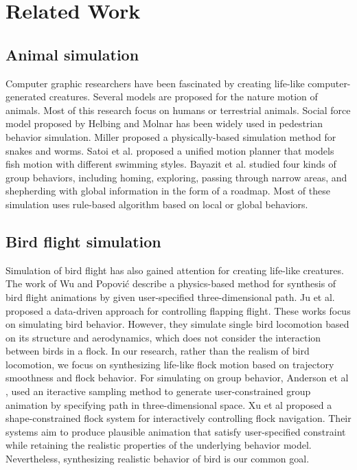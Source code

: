 \chapter{Related Work}

\section{Animal simulation}

Computer graphic researchers have been fascinated by creating life-like computer-generated creatures. Several models are proposed for the nature motion of animals. Most of this research focus on humans or terrestrial animals. Social force model proposed by Helbing and Molnar \cite{Social} has been widely used in pedestrian behavior simulation. Miller \cite{Snake} proposed a physically-based simulation method for snakes and worms. Satoi et al. proposed a unified motion planner \cite{Fish} that models fish motion with different swimming styles. Bayazit et al. \cite{OB1,OB2} studied four kinds of group behaviors, including homing, exploring, passing through narrow areas, and shepherding with global information in the form of a roadmap. Most of these simulation uses rule-based algorithm based on local or global behaviors.

\section{Bird flight simulation}

Simulation of bird flight has also gained attention for creating life-like creatures. The work of Wu and Popović \cite{Flight} describe a physics-based method for synthesis of bird flight animations by given user-specified three-dimensional path. Ju et al. \cite{Flappy} proposed a data-driven approach for controlling flapping flight. These works focus on simulating bird behavior. However, they simulate single bird locomotion based on its structure and aerodynamics, which does not consider the interaction between birds in a flock. In our research, rather than the realism of bird locomotion, we focus on synthesizing life-like flock motion based on trajectory smoothness and flock behavior. For simulating on group behavior, Anderson et al \cite{Constrained}, used an iteractive sampling method to generate user-constrained group animation by specifying path in three-dimensional space. Xu et al \cite{Shape} proposed a shape-constrained flock system for interactively controlling flock navigation. Their systems aim to produce plausible animation that satisfy user-specified constraint while retaining the realistic properties of the underlying behavior model. Nevertheless, synthesizing realistic behavior of bird is our common goal. 


